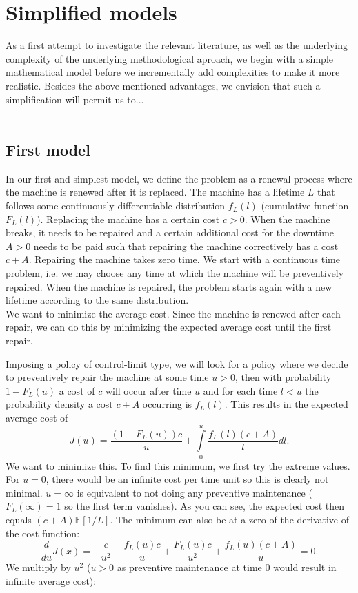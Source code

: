 \section{Simplified models}
As a first attempt to investigate the relevant literature, as well as the underlying complexity of the underlying methodological aproach, we begin with a simple mathematical model before we incrementally add complexities to make it more realistic.
Besides the above mentioned advantages, we envision that such a simplification will permit us to... 
\\
\\
\subsection{First model}
In our first and simplest model, we define the problem as a renewal process where the machine is renewed after it is replaced.
The machine has a lifetime $L$ that follows some continuously differentiable distribution $f_L(l)$ (cumulative function $F_L(l)$).
Replacing the machine has a certain cost $c>0$. When the machine breaks, it needs to be repaired and a certain additional cost for the downtime $A>0$ needs to be paid such that repairing the machine correctively has a cost $c+A$.
Repairing the machine takes zero time. We start with a continuous time problem, i.e. we may choose any time at which the machine will be preventively repaired.
When the machine is repaired, the problem starts again with a new lifetime according to the same distribution.\\
We want to minimize the average cost. Since the machine is renewed after each repair, we can do this by minimizing the expected average cost until the first repair.

Imposing a policy of control-limit type, we will look for a policy where we decide to preventively repair the machine at some time $u>0$, then with probability $1-F_L(u)$ a cost of $c$ will occur after time $u$ and for each time $l<u$ the probability density a cost $c+A$ occurring is $f_L(l)$.
This results in the expected average cost of\\
$$
J(u)=\frac{(1-F_L(u))c}{u}+\int\limits_{0}^u\frac{f_L(l)(c+A)}{l}dl.
$$
We want to minimize this. To find this minimum, we first try the extreme values. For $u=0$, there would be an infinite cost per time unit so this is clearly not minimal. $u=\infty$ is equivalent to not doing any preventive maintenance ($F_L(\infty)=1$ so the first term vanishes). As you can see, the expected cost then equals $(c+A)\mathbb{E}[1/L]$. The minimum can also be at a zero of the derivative of the cost function:
$$
\frac{d}{du}J(x)=-\frac{c}{u^2} - \frac{f_L(u)c}{u} +\frac{F_L(u)c}{u^2}+\frac{f_L(u)(c+A)}{u}=0.
$$
We multiply by $u^2$ ($u>0$ as preventive maintenance at time 0 would result in infinite average cost):


